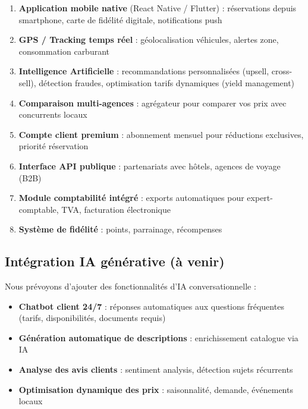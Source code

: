 \documentclass[12pt, a4paper]{article}
\begin{document}
\begin{enumerate}[leftmargin=*,noitemsep]
  \item \textbf{Application mobile native} (React Native / Flutter) : réservations depuis smartphone, carte de fidélité digitale, notifications push
  \item \textbf{GPS / Tracking temps réel} : géolocalisation véhicules, alertes zone, consommation carburant
  \item \textbf{Intelligence Artificielle} : recommandations personnalisées (upsell, cross-sell), détection fraudes, optimisation tarifs dynamiques (yield management)
  \item \textbf{Comparaison multi-agences} : agrégateur pour comparer vos prix avec concurrents locaux
  \item \textbf{Compte client premium} : abonnement mensuel pour réductions exclusives, priorité réservation
  \item \textbf{Interface API publique} : partenariats avec hôtels, agences de voyage (B2B)
  \item \textbf{Module comptabilité intégré} : exports automatiques pour expert-comptable, TVA, facturation électronique
  \item \textbf{Système de fidélité} : points, parrainage, récompenses
\end{enumerate}

\subsection{Intégration IA générative (à venir)}

Nous prévoyons d'ajouter des fonctionnalités d'IA conversationnelle :
\begin{itemize}[leftmargin=*,noitemsep]
  \item \textbf{Chatbot client 24/7} : réponses automatiques aux questions fréquentes (tarifs, disponibilités, documents requis)
  \item \textbf{Génération automatique de descriptions} : enrichissement catalogue via IA
  \item \textbf{Analyse des avis clients} : sentiment analysis, détection sujets récurrents
  \item \textbf{Optimisation dynamique des prix} : saisonnalité, demande, événements locaux
\end{itemize}

\end{document}
